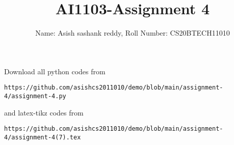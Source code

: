 \documentclass[journal,12pt,twocolumn]{IEEEtran}
\DeclareMathOperator*{\Res}{Res}
\begin{document}
\newcommand{\BEQA}{\begin{eqnarray}}
\newcommand{\EEQA}{\end{eqnarray}}
\newcommand{\define}{\stackrel{\triangle}{=}}

\raggedbottom
\setlength{\parindent}{0pt}
\providecommand{\mbf}{\mathbf}
\providecommand{\pr}[1]{\ensuremath{\Pr\left(#1\right)}}
\providecommand{\qfunc}[1]{\ensuremath{Q\left(#1\right)}}
\providecommand{\sbrak}[1]{\ensuremath{{}\left[#1\right]}}
\providecommand{\lsbrak}[1]{\ensuremath{{}\left[#1\right.}}
\providecommand{\rsbrak}[1]{\ensuremath{{}\left.#1\right]}}
\providecommand{\brak}[1]{\ensuremath{\left(#1\right)}}
\providecommand{\lbrak}[1]{\ensuremath{\left(#1\right.}}
\providecommand{\rbrak}[1]{\ensuremath{\left.#1\right)}}
\providecommand{\cbrak}[1]{\ensuremath{\left\{#1\right\}}}
\providecommand{\lcbrak}[1]{\ensuremath{\left\{#1\right.}}
\providecommand{\rcbrak}[1]{\ensuremath{\left.#1\right\}}}
\theoremstyle{remark}
\newtheorem{rem}{Remark}
\newcommand{\sgn}{\mathop{\mathrm{sgn}}}
\providecommand{\abs}[1]{\vert#1\vert}
\providecommand{\res}[1]{\Res\displaylimits_{#1}} 
\providecommand{\norm}[1]{\lVert#1\rVert}
\providecommand{\mtx}[1]{\mathbf{#1}}
\providecommand{\mean}[1]{E[ #1 ]}
\providecommand{\fourier}{\overset{\mathcal{F}}{ \rightleftharpoons}}
\providecommand{\system}{\overset{\mathcal{H}}{ \longleftrightarrow}}
\newcommand{\solution}{\noindent \textbf{Solution: }}
\newcommand{\cosec}{\,\text{cosec}\,}
\providecommand{\dec}[2]{\ensuremath{\overset{#1}{\underset{#2}{\gtrless}}}}
\newcommand{\myvec}[1]{\ensuremath{\begin{pmatrix}#1\end{pmatrix}}}
\newcommand{\mydet}[1]{\ensuremath{\begin{vmatrix}#1\end{vmatrix}}}
\makeatletter
{}
\makeatother
\let\StandardTheFigure\thefigure
\let\vec\mathbf
\renewcommand{\thefigure}{\theproblem}
\def\putbox#1#2#3{\makebox[0in][l]{\makebox[#1][l]{}\raisebox{\baselineskip}[0in][0in]{\raisebox{#2}[0in][0in]{#3}}}}
     \def\rightbox#1{\makebox[0in][r]{#1}}
     \def\centbox#1{\makebox[0in]{#1}}
     \def\topbox#1{\raisebox{-\baselineskip}[0in][0in]{#1}}
     \def\midbox#1{\raisebox{-0.5\baselineskip}[0in][0in]{#1}}
\vspace{3cm}
\title{AI1103-Assignment 4}
\author{Name: Asish sashank reddy, Roll Number: CS20BTECH11010}
\maketitle
\newpage
\bigskip
\renewcommand{\thefigure}{\theenumi}
\renewcommand{\thetable}{\theenumi}
Download all python codes from 
\begin{lstlisting}
https://github.com/asishcs2011010/demo/blob/main/assignment-4/assignment-4.py
\end{lstlisting}
%
and latex-tikz codes from 
%
\begin{lstlisting}
https://github.com/asishcs2011010/demo/blob/main/assignment-4/assignment-4(7).tex 
\end{lstlisting}
\end{document}
